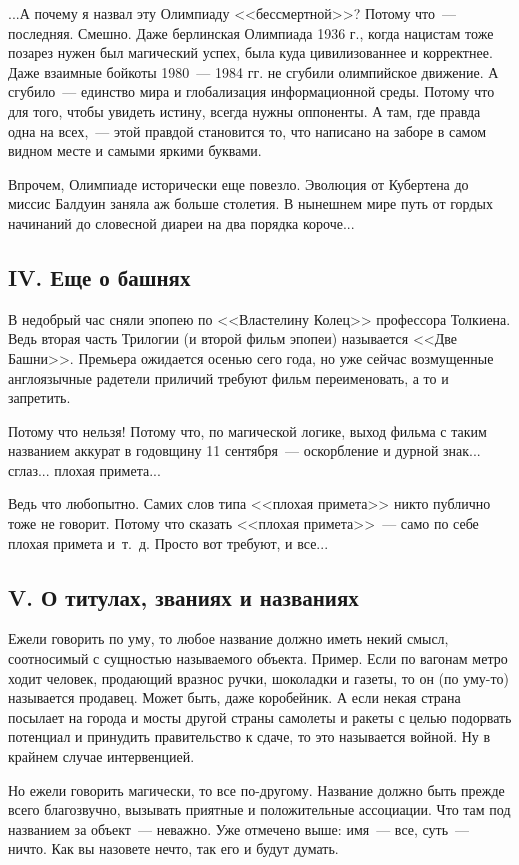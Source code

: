 \documentclass{scrbook}
\newcommand{\flqq}{<<}
\newcommand{\frqq}{>>}
\newcommand{\mdash}{~--- }
\newcommand{\commamdash}{~--- } %
\newcommand{\essaysection}[1]{\subsection*{#1}\nopagebreak}
\begin{document}
...А почему я назвал эту Олимпиаду {\flqq}бессмертной{\frqq}? Потому что{\mdash}последняя. Смешно. Даже берлинская Олимпиада 1936 г., когда нацистам тоже позарез нужен был магический успех, была куда цивилизованнее и корректнее. Даже взаимные бойкоты 1980{\mdash}1984 гг. не сгубили олимпийское движение. А сгубило{\mdash}единство мира и глобализация информационной среды. Потому что для того, чтобы увидеть истину, всегда нужны оппоненты. А там, где правда одна на всех,{\commamdash} этой правдой становится то, что написано на заборе в самом видном месте и самыми яркими буквами.

Впрочем, Олимпиаде исторически еще повезло. Эволюция от Кубертена до миссис Балдуин заняла аж больше столетия. В нынешнем мире путь от гордых начинаний до словесной диареи на два порядка короче...

\essaysection{IV. Еще о башнях}

В недобрый час сняли эпопею по {\flqq}Властелину Колец{\frqq} профессора Толкиена. Ведь вторая часть Трилогии (и второй фильм эпопеи) называется {\flqq}Две Башни{\frqq}. Премьера ожидается осенью сего года, но уже сейчас возмущенные англоязычные радетели приличий требуют фильм переименовать, а то и запретить.

Потому что нельзя! Потому что, по магической логике, выход фильма с таким названием аккурат в годовщину 11 сентября{\mdash}оскорбление и дурной знак... сглаз... плохая примета...

Ведь что любопытно. Самих слов типа {\flqq}плохая примета{\frqq} никто публично тоже не говорит. Потому что сказать {\flqq}плохая примета{\frqq}{\mdash}само по себе плохая примета и~т.~д. Просто вот требуют, и все...

\essaysection{V. О титулах, званиях и названиях}

Ежели говорить по уму, то любое название должно иметь некий смысл, соотносимый с сущностью называемого объекта. Пример. Если по вагонам метро ходит человек, продающий вразнос ручки, шоколадки и газеты, то он (по уму-то) называется продавец. Может быть, даже коробейник. А если некая страна посылает на города и мосты другой страны самолеты и ракеты с целью подорвать потенциал и принудить правительство к сдаче, то это называется войной. Ну в крайнем случае интервенцией.

Но ежели говорить магически, то все по-другому. Название должно быть прежде всего благозвучно, вызывать приятные и положительные ассоциации. Что там под названием за объект{\mdash}неважно. Уже отмечено выше: имя{\mdash}все, суть{\mdash}ничто. Как вы назовете нечто, так его и будут думать.
\end{document}
